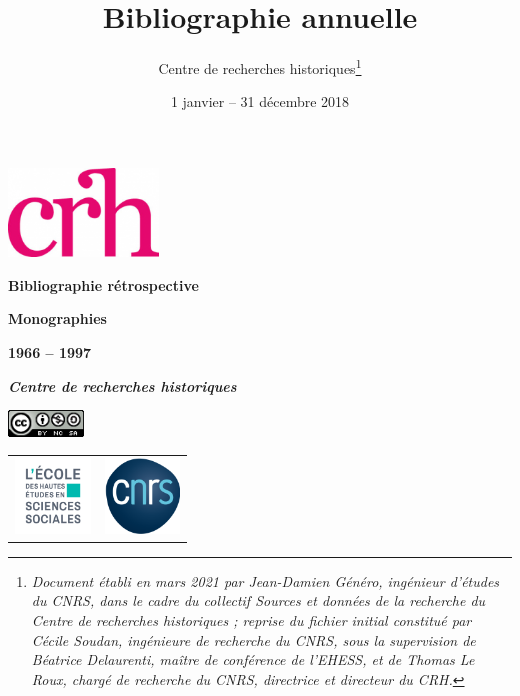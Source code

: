 \documentclass{article}
\title{\textbf{Bibliographie annuelle}}
\author{Centre de recherches historiques\footnote{\textit{Document établi en mars 2021 par Jean-Damien Généro, ingénieur d'études du CNRS, dans le cadre du collectif Sources et données de la recherche du Centre de recherches historiques ; reprise du fichier initial constitué par Cécile Soudan, ingénieure de recherche du CNRS, sous la supervision de Béatrice Delaurenti, maître de conférence de l'EHESS, et de 
Thomas Le Roux, chargé de recherche du CNRS, directrice et directeur du CRH.}}}
\date{1\up{er} janvier -- 31 décembre 2018}
\newcommand\blankpage{%
    \null
    \thispagestyle{empty}%
    \addtocounter{page}{-1}%
    \newpage}
\begin{document}
	
\renewcommand{\contentsname}{Sommaire}


\begin{titlepage}
	\begin{center}
		
		\vspace*{1,50cm}
		
		\includegraphics[width=4cm]{../../../img/logo_crh_magenta.png}
		\bigskip
		\bigskip
		\bigskip
		\bigskip
		
		\begin{Huge}
			\textbf{Bibliographie rétrospective}
			
			\bigskip
			
			\bigskip
			
			\textbf{Monographies}
		\end{Huge}
		
		\begin{LARGE}
			\bigskip
			
			\bigskip
			
			\textbf{1966 -- 1997}
			
			\bigskip
			
			\textbf{\emph{Centre de recherches historiques} }\\
		\end{LARGE}
		
		\bigskip
		
		\vspace*{2.25cm}
		
		\includegraphics[width=2cm]{../../../img/licenseccby-nc-sa4.0.png}
		
		\vspace*{3,5cm}
		
		\begin{tabular}{cc}
			\includegraphics[width=2cm]{../../../img/Logo_EHESS_2021_RVB.png} & \includegraphics[width=2cm]{../../../img/cnrslogo.png} \\
		\end{tabular}
		
	\end{center}
	\afterpage{\blankpage}
\end{titlepage}
\end{document}
